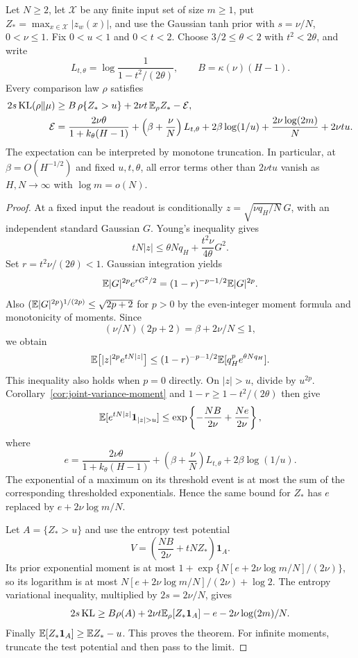 \begin{theorem}
\label{thm:joint-prefactor-floor}
Let $N\ge2$, let $\mathcal X$ be any finite input set of size $m\ge1$, put $Z_*=\max_{x\in\mathcal X}|z_w(x)|$, and use the Gaussian tanh prior with $s=\nu/N$, $0<\nu\le1$. Fix $0<u<1$ and $0<t<2$. Choose $3/2\le\theta<2$ with $t^2<2\theta$, and write
\[
 L_{t,\theta}=\log\frac1{1-t^2/(2\theta)},\qquad
 B=\kappa(\nu)(H-1).
\]
Every comparison law $\rho$ satisfies
\begin{align*}
 2s\operatorname{KL}(\rho\|\mu)
 &\ge B\,\rho\{Z_*>u\}+2\nu t\,\mathbb E_\rho Z_* -\mathcal E,\\
 \mathcal E
 &=\frac{2\nu\theta}{1+k_\theta(H-1)}
   +\left(\beta+\frac\nu N\right)L_{t,\theta}
   +2\beta\log(1/u)
   +\frac{2\nu\log(2m)}N+2\nu t u.
\end{align*}
The expectation can be interpreted by monotone truncation. In particular, at $\beta=O(H^{-1/2})$ and fixed $u,t,\theta$, all error terms other than $2\nu t u$ vanish as $H,N\to\infty$ with $\log m=o(N)$.
\end{theorem}
\begin{proof}
At a fixed input the readout is conditionally $z=\sqrt{\nu q_H/N}\,G$, with an independent standard Gaussian $G$. Young's inequality gives
\[
 tN|z|\le\theta Nq_H+\frac{t^2\nu}{4\theta}G^2.
\]
Set $r=t^2\nu/(2\theta)<1$. Gaussian integration yields
\[
 \mathbb E|G|^{2p}e^{rG^2/2}
 =(1-r)^{-p-1/2}\mathbb E|G|^{2p}.
\]
Also $(\mathbb E|G|^{2p})^{1/(2p)}\le\sqrt{2p+2}$ for $p>0$ by the even-integer moment formula and monotonicity of moments. Since
\[
 (\nu/N)(2p+2)=\beta+2\nu/N\le1,
\]
we obtain
\[
 \mathbb E\bigl[|z|^{2p}e^{tN|z|}\bigr]
 \le(1-r)^{-p-1/2}\mathbb E[q_H^p e^{\theta Nq_H}].
\]
This inequality also holds when $p=0$ directly. On $|z|>u$, divide by $u^{2p}$. Corollary~\ref{cor:joint-variance-moment} and $1-r\ge1-t^2/(2\theta)$ then give
\[
 \E[e^{tN|z|}\mathbf1_{|z|>u}]
 \le\exp\left\{-\frac{NB}{2\nu}+\frac{N e}{2\nu}\right\},
\]
where
\[
 e=\frac{2\nu\theta}{1+k_\theta(H-1)}
    +\left(\beta+\frac\nu N\right)L_{t,\theta}
    +2\beta\log(1/u).
\]
The exponential of a maximum on its threshold event is at most the sum of the corresponding thresholded exponentials. Hence the same bound for $Z_*$ has $e$ replaced by $e+2\nu\log m/N$.

Let $A=\{Z_*>u\}$ and use the entropy test potential
\[
 V=\left(\frac{NB}{2\nu}+tNZ_*\right)\mathbf1_A.
\]
Its prior exponential moment is at most
$1+\exp\{N[e+2\nu\log m/N]/(2\nu)\}$, so its logarithm is at most $N[e+2\nu\log m/N]/(2\nu)+\log2$. The entropy variational inequality, multiplied by $2s=2\nu/N$, gives
\[
 2s\operatorname{KL}\ge B\rho(A)+2\nu t\mathbb E_\rho[Z_*\mathbf1_A]
                -e-2\nu\log(2m)/N.
\]
Finally $\mathbb E[Z_*\mathbf1_A]\ge\mathbb E Z_*-u$. This proves the theorem. For infinite moments, truncate the test potential and then pass to the limit.
\end{proof}
